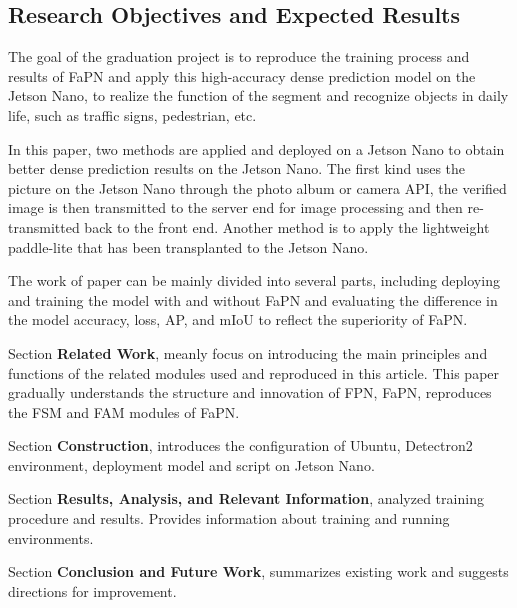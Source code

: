 \subsection{Research Objectives and Expected Results}
The goal of the graduation project is to reproduce the training process and results of FaPN \cite{huang2021fapn} and apply this high-accuracy dense prediction model on the Jetson Nano, to realize the function of the segment and recognize objects in daily life, such as traffic signs, pedestrian, etc.

In this paper, two methods are applied and deployed on a Jetson Nano to obtain better dense prediction results on the Jetson Nano. The first kind uses the picture on the Jetson Nano through the photo album or camera API, the verified image is then transmitted to the server end for image processing and then re-transmitted back to the front end. Another method is to apply the lightweight paddle-lite \cite{paddlelite} that has been transplanted to the Jetson Nano.

The work of paper can be mainly divided into several parts, including deploying and training the model with and without FaPN and evaluating the difference in the model accuracy, loss, AP, and mIoU to reflect the superiority of FaPN.

Section \uppercase\expandafter{} \textbf{Related Work}, meanly focus on introducing the main principles and functions of the related modules used and reproduced in this article. This paper gradually understands the structure and innovation of FPN, FaPN, reproduces the FSM and FAM modules of FaPN.


Section \uppercase\expandafter{} \textbf{Construction}, introduces the configuration of Ubuntu, Detectron2 environment, deployment model and script on Jetson Nano.


Section \uppercase\expandafter{} \textbf{Results, Analysis, and Relevant Information}, analyzed training procedure and results. Provides information about training and running environments.


Section \uppercase\expandafter{} \textbf{Conclusion and Future Work}, summarizes existing work and suggests directions for improvement.
\clearpage